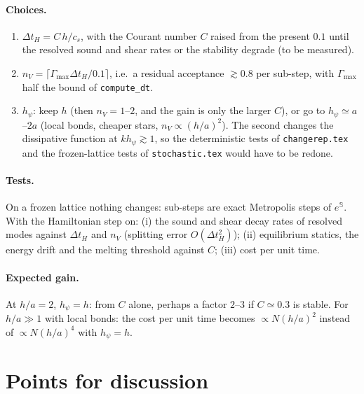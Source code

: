 \documentclass[11pt,aps,preprint,nofootinbib,superscriptaddress,tightenlines]{revtex4-2}
\let\oldparagraph\paragraph
\renewcommand{\paragraph}{\par\bigskip\oldparagraph}
\begin{document}
\paragraph{Choices.}
\begin{enumerate}
\item $\Delta t_H=C\,h/c_s$, with the Courant number $C$ raised from the present $0.1$
  until the resolved sound and shear rates or the stability degrade (to be measured).
\item $n_V=\lceil\Gamma_{\max}\Delta t_H/0.1\rceil$, i.e.\ a residual acceptance $\gtrsim0.8$ per
  sub-step, with $\Gamma_{\max}$ half the bound of \texttt{compute\_dt}.
\item $h_\psi$: keep $h$ (then $n_V=1$--$2$, and the gain is only the larger $C$), or go to
  $h_\psi\simeq a$--$2a$ (local bonds, cheaper stars, $n_V\propto(h/a)^2$).  The second changes the
  dissipative function at $kh_\psi\gtrsim1$, so the deterministic tests of
  \texttt{changerep.tex} and the frozen-lattice tests of \texttt{stochastic.tex} would have
  to be redone.
\end{enumerate}

\paragraph{Tests.}  On a frozen lattice nothing changes: sub-steps are exact Metropolis
steps of $e^{\mathbb S}$.  With the Hamiltonian step on: (i) the sound and shear decay
rates of resolved modes against $\Delta t_H$ and $n_V$ (splitting error $O(\Delta t_H^2)$);
(ii) equilibrium statics, the energy drift and the melting threshold against $C$;
(iii) cost per unit time.

\paragraph{Expected gain.}  At $h/a=2$, $h_\psi=h$: from $C$ alone, perhaps a factor $2$--$3$
if $C\simeq0.3$ is stable.  For $h/a\gg1$ with local bonds: the cost per unit time
becomes $\propto N(h/a)^2$ instead of $\propto N(h/a)^4$ with $h_\psi=h$.

\section{Points for discussion}
\label{sec:discuss}
\end{document}
